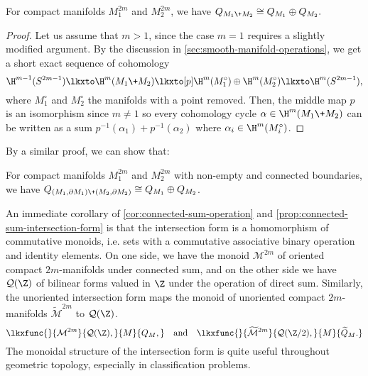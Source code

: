 \begin{proposition}\label{prop:connected-sum-intersection-form}
	For compact manifolds $M_1^{2m}$ and $M_2^{2m}$, we have
	$Q_{M_1\+M_2} \cong Q_{M_1}\oplus Q_{M_2}.$
\end{proposition}
\begin{proof}
	Let us assume that $m>1$, since the case $m=1$ requires a slightly modified argument. By the discussion in \cref{sec:smooth-manifold-operations}, we get a short exact sequence of cohomology
	\[
		\H^{m-1}(S^{2m-1})\lkxto \H^m(M_1\+M_2) \lkxto[p] \H^m(M_1^\circ)\oplus \H^m(M_2^\circ)\lkxto \H^m(S^{2m-1}),
	\]
	where $M_1^\circ$ and $M_2^\circ$ the manifolds with a point removed.
	Then, the middle map $p$ is an isomorphism since $m\neq 1$ so every cohomology cycle $\alpha\in \H^m(M_1\+M_2)$ can be written as a sum $p^{-1}(\alpha_1) + p^{-1}(\alpha_2)$ where $\alpha_i\in \H^m(M_i^\circ)$. 
\end{proof}

By a similar proof, we can show that:

\begin{proposition}\label{prop:boundary-connected-sum-intersection-form}
	For compact manifolds $M_1^{2m}$ and $M_2^{2m}$ with non-empty and connected boundaries, we have $Q_{(M_1,\partial M_1)\+ (M_2,\partial M_2)} \cong Q_{M_1}\oplus Q_{M_2}$.
\end{proposition}

An immediate corollary of \cref{cor:connected-sum-operation} and \cref{prop:connected-sum-intersection-form} is
that the intersection form is a homomorphism of commutative monoids, i.e. sets with a commutative associative binary operation and identity elements. On one side, we have the monoid $\mathcal{M}^{2m}$ of oriented compact $2m$-manifolds under connected sum, and on the other side we have $\mathcal{Q}(\Z)$ of bilinear forms valued in $\Z$ under the operation of direct sum. Similarly, the unoriented intersection form maps the monoid of unoriented compact $2m$-manifolds $\widetilde{\mathcal{M}}^{2m}$ to $\mathcal{Q}(\Z)$.
\begin{equation}\label{eq:monoid-homomorphism-intersection-form}
	\lkxfunc{}{\mathcal{M}^{2m}}{\mathcal{Q}(\Z),}{M}{Q_M,}
	\quad\textrm{and}\quad
	\lkxfunc{}{\widetilde{\mathcal{M}}^{2m}}{\mathcal{Q}(\Z/2),}{M}{\widetilde{Q}_M.}
\end{equation}
The monoidal structure of the intersection form is quite useful throughout geometric topology, especially in classification problems.

